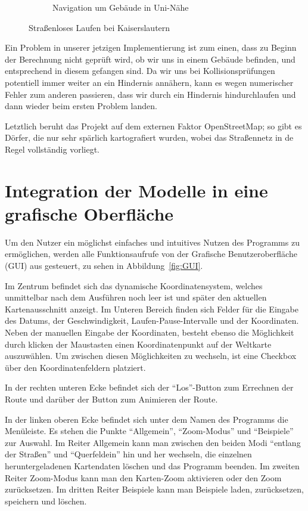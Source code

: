 \documentclass[
    paper=a4,
    DIV14,
    fontsize=12pt,
    pagesize=pdftex,
    toc=bibliographynumbered
]{scrartcl}
\numberwithin{figure}{section}
\numberwithin{equation}{section}
\numberwithin{table}{section}
\begin{document}
\begin{figure}[hbt]
\begin{subfigure}{0.49\textwidth}
        \caption{Navigation um Gebäude in Uni-Nähe}
    \end{subfigure}
    \caption{Straßenloses Laufen bei Kaiserslautern}
    \label{fig:nostreet}
\end{figure}

Ein Problem in unserer jetzigen Implementierung ist zum einen, dass zu Beginn der
Berechnung nicht geprüft wird, ob wir uns in einem Gebäude befinden, und entsprechend in
diesem gefangen sind. Da wir uns bei Kollisionsprüfungen potentiell immer weiter an ein
Hindernis annähern, kann es wegen numerischer Fehler zum anderen passieren, dass wir durch
ein Hindernis hindurchlaufen und dann wieder beim ersten Problem landen.

Letztlich beruht das Projekt auf dem externen Faktor OpenStreetMap; so gibt es Dörfer, die
nur sehr spärlich kartografiert wurden, wobei das Straßennetz in de Regel vollständig
vorliegt.

\section{Integration der Modelle in eine grafische Oberfläche}
\label{sec:gui}

Um den Nutzer ein möglichst einfaches und intuitives Nutzen des Programms zu ermöglichen,
werden alle Funktionsaufrufe von der Grafische Benutzeroberfläche (GUI) aus gesteuert,
zu sehen in Abbildung~\ref{fig:GUI}.

Im Zentrum befindet sich das dynamische Koordinatensystem, welches unmittelbar nach dem
Ausführen noch leer ist und später den aktuellen Kartenausschnitt anzeigt. Im Unteren
Bereich finden sich Felder für die Eingabe des Datums, der Geschwindigkeit,
Laufen-Pause-Intervalle und der Koordinaten. Neben der manuellen Eingabe der Koordinaten,
besteht ebenso die Möglichkeit durch klicken der Maustasten einen Koordinatenpunkt auf der
Weltkarte auszuwählen. Um zwischen diesen Möglichkeiten zu wechseln, ist eine Checkbox
über den Koordinatenfeldern platziert.

In der rechten unteren Ecke befindet sich der \enquote{Los}-Button zum Errechnen der Route
und darüber der Button zum Animieren der Route.

In der linken oberen Ecke befindet sich unter dem Namen des Programms die Menüleiste. Es
stehen die Punkte \enquote{Allgemein}, \enquote{Zoom-Modus} und \enquote{Beispiele} zur
Auswahl. Im Reiter Allgemein kann man zwischen den beiden Modi \enquote{entlang der
Straßen} und \enquote{Querfeldein} hin und her wechseln, die einzelnen heruntergeladenen
Kartendaten löschen und das Programm beenden. Im zweiten Reiter Zoom-Modus kann man den
Karten-Zoom aktivieren oder den Zoom zurücksetzen. Im dritten Reiter Beispiele kann man
Beispiele laden, zurücksetzen, speichern und löschen.
\end{document}
